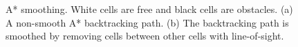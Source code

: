 \begin{figure}[h!]
    \centering
	\caption[Smoothing of the A* backtracking path.]{A* smoothing. White cells are free and black cells are obstacles. (a) A non-smooth A* backtracking path. (b) The backtracking path is smoothed by removing cells between other cells with line-of-sight.} \label{fig:backtracking}
\end{figure}

